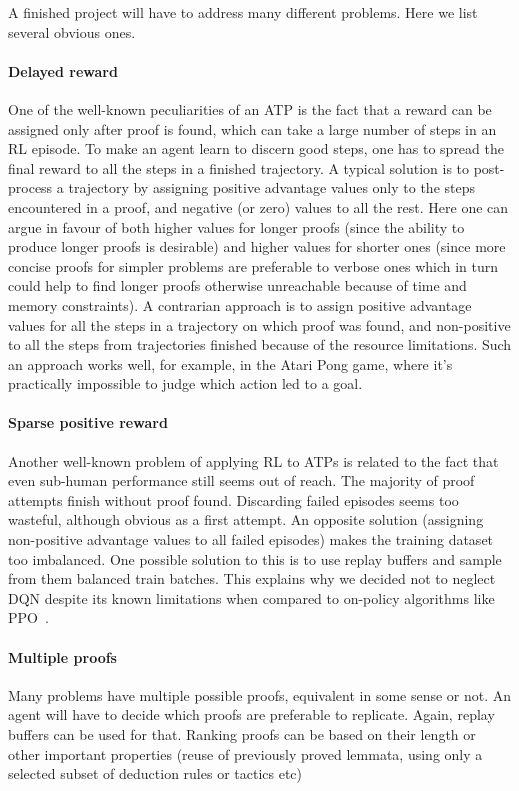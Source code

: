 \documentclass{easychair}
\begin{document}
A finished project will have to address many different problems. Here we list several obvious ones.
\paragraph{Delayed reward} One of the well-known peculiarities of an ATP is the fact that a reward can be assigned only after proof is found, which can take a large number of steps in an RL episode. To make an agent learn to discern good steps, one has to spread the final reward to all the steps in a finished trajectory. A typical solution is to post-process a trajectory by assigning positive advantage values only to the steps encountered in a proof, and negative (or zero) values to all the rest. Here one can argue in favour of both higher values for longer proofs (since the ability to produce longer proofs is desirable) and higher values for shorter ones (since more concise proofs for simpler problems are preferable to verbose ones which in turn could help to find longer proofs otherwise unreachable because of time and memory constraints). A contrarian approach is to assign positive advantage values for all the steps in a trajectory on which proof was found, and non-positive to all the steps from trajectories finished because of the resource limitations. Such an approach works well, for example, in the Atari Pong game, where it's practically impossible to judge which action led to a goal.
\paragraph{Sparse positive reward} Another well-known problem of applying RL to ATPs is related to the fact that even sub-human performance still seems out of reach. The majority of proof attempts finish without proof found. Discarding failed episodes seems too wasteful, although obvious as a first attempt. An opposite solution (assigning non-positive advantage values to all failed episodes) makes the training dataset too imbalanced. One possible solution to this is to use replay buffers and sample from them balanced train batches. This explains why we decided not to neglect DQN despite its known limitations when compared to on-policy algorithms like PPO~\cite{Schulman2017ProximalPO}.
\paragraph{Multiple proofs} Many problems have multiple possible proofs, equivalent in some sense or not. An agent will have to decide which proofs are preferable to replicate. Again, replay buffers can be used for that. Ranking proofs can be based on their length or other important properties (reuse of previously proved lemmata, using only a selected subset of deduction rules or tactics etc)
\end{document}
